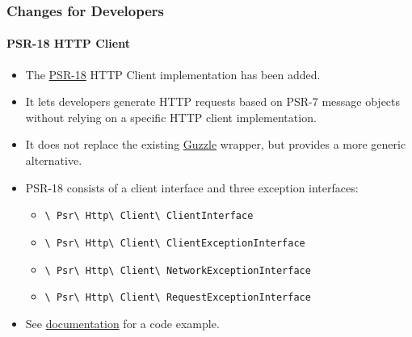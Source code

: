 
\begin{frame}[fragile]
	\frametitle{Changes for Developers}
	\framesubtitle{PSR-18 HTTP Client}

	\begin{itemize}
		\item The \href{https://www.php-fig.org/psr/psr-18/}{PSR-18}
			HTTP Client implementation has been added.
		\item It lets developers generate HTTP requests based on PSR-7
			message objects without relying on a specific HTTP client implementation.
		\item It does not replace the existing \href{http://guzzlephp.org/}{Guzzle}
			wrapper, but provides a more generic alternative.
		\item PSR-18 consists of a client interface and three exception interfaces:

			\begin{itemize}\smaller
				\item \texttt{\textbackslash
					Psr\textbackslash
					Http\textbackslash
					Client\textbackslash
					ClientInterface}
				\item \texttt{\textbackslash
					Psr\textbackslash
					Http\textbackslash
					Client\textbackslash
					ClientExceptionInterface}
				\item \texttt{\textbackslash
					Psr\textbackslash
					Http\textbackslash
					Client\textbackslash
					NetworkExceptionInterface}
				\item \texttt{\textbackslash
					Psr\textbackslash
					Http\textbackslash
					Client\textbackslash
					RequestExceptionInterface}
			\end{itemize}\normalsize

		\item See
			\href{https://docs.typo3.org/c/typo3/cms-core/master/en-us/Changelog/10.1/Feature-89216-PSR-18HTTPClientImplementation.html}{documentation}
			for a code example.

	\end{itemize}

\end{frame}


